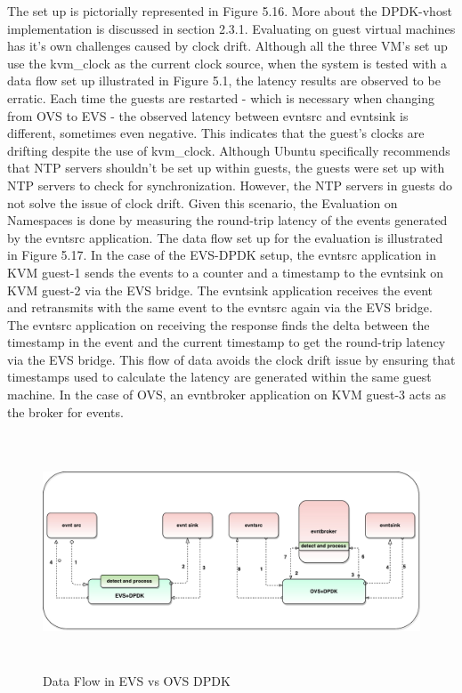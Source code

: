 The set up is pictorially represented in Figure 5.16. More about the DPDK-vhost implementation is discussed in section 2.3.1. Evaluating on guest virtual machines has it's own challenges caused by clock drift. Although all the three VM's set up use the kvm_clock as the current clock source, when the system is tested with a data flow set up illustrated in Figure 5.1, the latency results are observed to be erratic. Each time the guests are restarted - which is necessary when changing from OVS to EVS - the observed latency between evntsrc and evntsink is different, sometimes even negative. This indicates that the guest's clocks are drifting despite the use of kvm_clock. Although Ubuntu specifically recommends that NTP servers shouldn't be set up within guests, the guests were set up with NTP servers to check for synchronization. However, the NTP servers in guests do not solve the issue of clock drift. Given this scenario, the Evaluation on Namespaces is done by measuring the round-trip latency of the events generated by the evntsrc application. The data flow set up for the evaluation is illustrated in Figure 5.17. In the case of the EVS-DPDK setup, the evntsrc application in KVM guest-1 sends the events to a counter and a timestamp to the evntsink on KVM guest-2 via the EVS bridge. The evntsink application receives the event and retransmits with the same event to the evntsrc again via the EVS bridge. The evntsrc application on receiving the response finds the delta between the timestamp in the event and the current timestamp to get the round-trip latency via the EVS bridge. This flow of data avoids the clock drift issue by ensuring that timestamps used to calculate the latency are generated within the same guest machine. In the case of OVS, an evntbroker application on KVM guest-3 acts as the broker for events.



 \begin{figure}[H]
 \centering
 \caption{Data Flow in EVS vs OVS DPDK}
 \includegraphics[height=7cm]{evsovsdpdk.pdf}
\end{figure}


